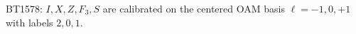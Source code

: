 \begin{center}\small
BT1578: $I,X,Z,F_3,S$ are calibrated on the centered OAM basis $\ell=-1,0,+1$ with labels $2,0,1$.
\end{center}

